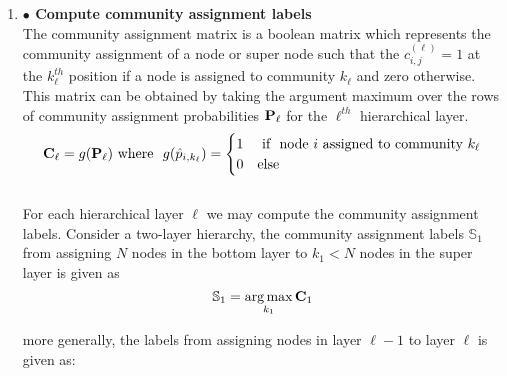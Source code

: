 \documentclass[a4paper,12pt]{article}
\DeclareMathOperator*{\argmax}{arg\,max}
\begin{document}
\begin{itemize}
\begin{enumerate}
{\begin{enumerate}
					Therefore, each row represents a valid probability distribution for assigning nodes to $k_1$ communities. \\
					
				
					
				
				
				\item[]{\textbf{$\bullet$ Compute community assignment labels} \\
					The community assignment matrix is a boolean matrix which represents the community assignment of a node or super node such that the $c_{i,j}^{(\ell)} = 1$ at the $k_\ell^{th}$ position if a node is assigned to community $k_\ell$ and zero otherwise. This matrix can be obtained by taking the argument maximum over the rows of community assignment probabilities ${\bf P}_\ell$ for the $\ell^{th}$ hierarchical layer.  
					\[{\bf C}_{\ell} = g({\bf P}_{\ell}) \ \text{where} \ \  g(\hat{p}_{i,k_\ell}) = 
					\begin{cases} 1 & \ \text{if} \ \ \text{node $i$ assigned to community $k_\ell$} \\ %
						0 & \text{else} %
					\end{cases}\]\\
				
				
					For each hierarchical layer $\ell$ we may compute the community assignment labels. Consider a two-layer hierarchy, the community assignment labels $\mathbb{S}_1$ from assigning $N$ nodes in the bottom layer to $k_1 < N$ nodes in the super layer is given as 
					\[\mathbb{S}_1 = \argmax_{k_1} {\bf C}_1 \]
					
					more generally, the labels from assigning nodes in layer $\ell - 1$ to layer $\ell$ is given as:
					
}
\end{enumerate}}
\end{enumerate}
\end{itemize}
\end{document}
